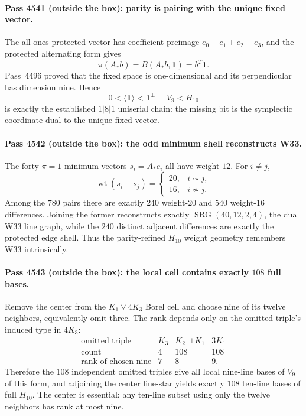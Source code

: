 \paragraph{Pass 4541 (outside the box): parity is pairing with the unique fixed vector.}
The all-ones protected vector has coefficient preimage
$e_0+e_1+e_2+e_3$, and the protected alternating form gives
\[
 \boxed{\pi(A_*b)=B(A_*b,\mathbf1)=b^T\mathbf1.}
\]
Pass~4496 proved that the fixed space is one-dimensional and its perpendicular
has dimension nine.  Hence
\[
 0<\langle\mathbf1\rangle<\mathbf1^\perp=V_9<H_{10}
\]
is exactly the established $1|8|1$ uniserial chain: the missing bit is the
symplectic coordinate dual to the unique fixed vector.

\paragraph{Pass 4542 (outside the box): the odd minimum shell reconstructs W33.}
The forty $\pi=1$ minimum vectors $s_i=A_*e_i$ all have weight $12$.  For
$i\ne j$,
\[
 \operatorname{wt}(s_i+s_j)=
 \begin{cases}20,&i\sim j,\\16,&i\not\sim j.\end{cases}
\]
Among the $780$ pairs there are exactly $240$ weight-$20$ and $540$ weight-$16$
differences.  Joining the former reconstructs exactly
$\operatorname{SRG}(40,12,2,4)$, the dual W33 line graph, while the $240$
distinct adjacent differences are exactly the protected edge shell.  Thus the
parity-refined $H_{10}$ weight geometry remembers W33 intrinsically.

\paragraph{Pass 4543 (outside the box): the local cell contains exactly $108$ full bases.}
Remove the center from the $K_1\vee4K_3$ Borel cell and choose nine of its twelve
neighbors, equivalently omit three.  The rank depends only on the omitted
triple's induced type in $4K_3$:
\[
\begin{array}{c|ccc}
\text{omitted triple}&K_3&K_2\sqcup K_1&3K_1\\ \hline
\text{count}&4&108&108\\
\text{rank of chosen nine}&7&8&9.
\end{array}
\]
Therefore the $108$ independent omitted triples give all local nine-line bases
of $V_9$ of this form, and adjoining the center line-star yields exactly $108$
ten-line bases of full $H_{10}$.  The center is essential: any ten-line subset
using only the twelve neighbors has rank at most nine.

